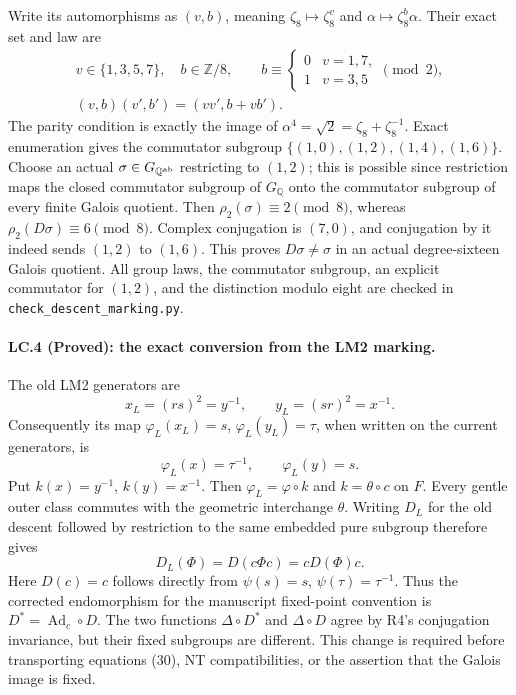 Write its automorphisms as $(v,b)$, meaning
$\zeta_8\mapsto\zeta_8^v$ and
$\alpha\mapsto\zeta_8^b\alpha$. Their exact set and law are
\[
 \begin{gathered}
 v\in\{1,3,5,7\},\quad b\in\mathbb Z/8,\qquad
 b\equiv\begin{cases}0&v=1,7,\\1&v=3,5\end{cases}\pmod2,\\
 (v,b)(v',b')=(vv',b+vb').
 \end{gathered}
\]
The parity condition is exactly the image of
$\alpha^4=\sqrt2=\zeta_8+\zeta_8^{-1}$. Exact enumeration
gives the commutator subgroup $\{(1,0),(1,2),(1,4),(1,6)\}$.
Choose an actual $\sigma\in G_{\mathbb Q^{\rm ab}}$ restricting
to $(1,2)$; this is possible since restriction maps the closed
commutator subgroup of $G_{\mathbb Q}$ onto the commutator
subgroup of every finite Galois quotient. Then
$\rho_2(\sigma)\equiv2\pmod8$, whereas
$\rho_2(D\sigma)\equiv6\pmod8$. Complex conjugation is
$(7,0)$, and conjugation by it indeed sends $(1,2)$ to $(1,6)$.
This proves $D\sigma\ne\sigma$ in an actual degree-sixteen
Galois quotient. All group laws, the commutator subgroup, an
explicit commutator for $(1,2)$, and the distinction modulo eight
are checked in \texttt{check\_descent\_marking.py}.

\paragraph{LC.4 (Proved): the exact conversion from the LM2 marking.}
The old LM2 generators are
\[
 x_L=(rs)^2=y^{-1},\qquad y_L=(sr)^2=x^{-1}.
\]
Consequently its map $\varphi_L(x_L)=s$, $\varphi_L(y_L)=\tau$,
when written on the current generators, is
\[
 \varphi_L(x)=\tau^{-1},\qquad \varphi_L(y)=s.
\]
Put $k(x)=y^{-1}$, $k(y)=x^{-1}$. Then
$\varphi_L=\varphi\circ k$ and $k=\theta\circ c$ on $F$.
Every gentle outer class commutes with the geometric interchange
$\theta$. Writing $D_L$ for the old descent followed by restriction
to the same embedded pure subgroup therefore gives
\[
 D_L(\Phi)=D(c\Phi c)=cD(\Phi)c.
\]
Here $D(c)=c$ follows directly from
$\psi(s)=s$, $\psi(\tau)=\tau^{-1}$. Thus the corrected
endomorphism for the manuscript fixed-point convention is
$D^*=\operatorname{Ad}_c\circ D$. The two functions
$\Delta\circ D^*$ and $\Delta\circ D$ agree by R4's
conjugation invariance, but their fixed subgroups are different.
This change is required before transporting equations (30), NT
compatibilities, or the assertion that the Galois image is fixed.

